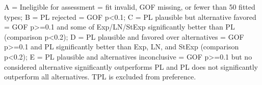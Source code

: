 \begin{flushleft}\footnotesize A = Ineligible for assessment = fit invalid, GOF missing, or fewer than 50 fitted types; B = PL rejected = GOF p<0.1; C = PL plausible but alternative favored = GOF p>=0.1 and some of Exp/LN/StExp significantly better than PL (comparison p<0.2); D = PL plausible and favored over alternatives = GOF p>=0.1 and PL significantly better than Exp, LN, and StExp (comparison p<0.2); E = PL plausible and alternatives inconclusive = GOF p>=0.1 but no considered alternative significantly outperforms PL and PL does not significantly outperform all alternatives. TPL is excluded from preference.\end{flushleft}
